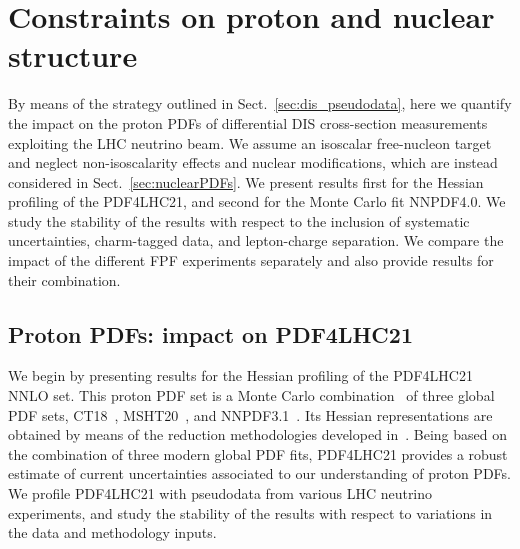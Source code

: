 \section{Constraints on proton and nuclear structure}
\label{sec:protonPDFs}

By means of the strategy outlined in Sect.~\ref{sec:dis_pseudodata}, here
we quantify the impact on the proton PDFs
of differential  DIS
cross-section measurements exploiting the  LHC
neutrino beam. 
%
We assume an isoscalar free-nucleon target and neglect non-isoscalarity effects and nuclear modifications,
which are instead considered in Sect.~\ref{sec:nuclearPDFs}.
%
We present results first for the Hessian profiling of the PDF4LHC21,
and second for the Monte Carlo fit NNPDF4.0.
%
We study the stability of the results with respect to the inclusion of systematic uncertainties,
charm-tagged data, and lepton-charge separation.
%
We compare the impact of the different FPF experiments separately and also provide
results for their combination.

\subsection{Proton PDFs: impact on PDF4LHC21}
\label{sec:pdf4lhc21}

We begin by presenting results for the Hessian profiling of
the PDF4LHC21 NNLO set.
%
This proton PDF set is a Monte Carlo combination~\cite{Watt:2012tq,Carrazza:2015hva} of three global PDF sets, CT18~\cite{Hou:2019efy},
MSHT20~\cite{Bailey:2020ooq}, and NNPDF3.1~\cite{NNPDF:2017mvq}.
%
Its Hessian representations are obtained by means of the reduction methodologies developed in~\cite{Gao:2013bia,Carrazza:2015aoa}.
%
Being based on the combination of three modern global PDF fits, PDF4LHC21 provides a robust estimate
of  current uncertainties associated to our understanding of proton PDFs.
%
We profile PDF4LHC21 with pseudodata from various LHC neutrino experiments,
and study the stability of the results with respect to variations in the data
and methodology inputs.

